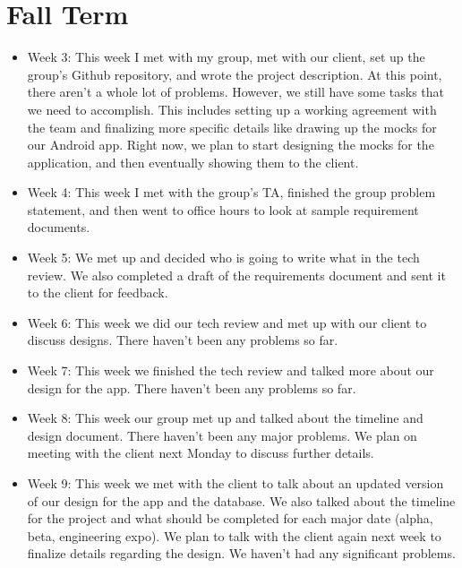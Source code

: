 \documentclass[onecolumn, draftclsnofoot,10pt, compsoc]{IEEEtran}
\begin{document}

\section{Fall Term}
\begin{itemize}
     \item Week 3: This week I met with my group, met with our client, set up the group's Github repository, and wrote the project description. At this point, there aren't a whole lot of problems. However, we still have some tasks that we need to accomplish. This includes setting up a working agreement with the team and finalizing more specific details like drawing up the mocks for our Android app. Right now, we plan to start designing the mocks for the application, and then eventually showing them to the client.  
     \item Week 4: This week I met with the group's TA, finished the group problem statement, and then went to office hours to look at sample requirement documents.
     \item Week 5: We met up and decided who is going to write what in the tech review. We also completed a draft of the requirements document and sent it to the client for feedback.
     \item Week 6: This week we did our tech review and met up with our client to discuss designs. There haven't been any problems so far.
     \item Week 7: This week we finished the tech review and talked more about our design for the app. There haven't been any problems so far.
     \item Week 8: This week our group met up and talked about the timeline and design document. There haven't been any major problems. We plan on meeting with the client next Monday to discuss further details.
     \item Week 9: This week we met with the client to talk about an updated version of our design for the app and the database. We also talked about the timeline for the project and what should be completed for each major date (alpha, beta, engineering expo). We plan to talk with the client again next week to finalize details regarding the design. We haven't had any significant problems.
 \end{itemize}
 
\end{document}
